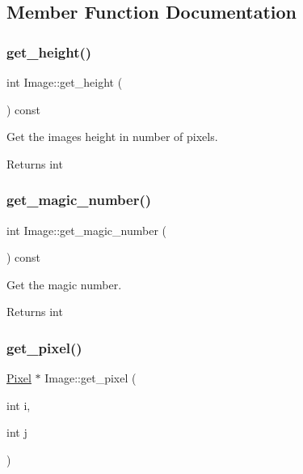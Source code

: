 \subsection{Member Function Documentation}
\mbox{\label{classImage_a04c7d24c9473e327e15c560c8193b684}} 
\subsubsection{\texorpdfstring{get\+\_\+height()}{get\_height()}}
{\footnotesize\ttfamily int Image\+::get\+\_\+height (\begin{DoxyParamCaption}{ }\end{DoxyParamCaption}) const}



Get the image\textquotesingle{}s height in number of pixels. 

\begin{DoxyReturn}{Returns}
int 
\end{DoxyReturn}
\mbox{\label{classImage_aa5d430b86cb564263b5fc09f0574daff}} 
\subsubsection{\texorpdfstring{get\+\_\+magic\+\_\+number()}{get\_magic\_number()}}
{\footnotesize\ttfamily int Image\+::get\+\_\+magic\+\_\+number (\begin{DoxyParamCaption}{ }\end{DoxyParamCaption}) const}



Get the magic number. 

\begin{DoxyReturn}{Returns}
int 
\end{DoxyReturn}
\mbox{\label{classImage_a7c7f88f027f4bfc564883fcf5a2e799b}} 
\subsubsection{\texorpdfstring{get\+\_\+pixel()}{get\_pixel()}}
{\footnotesize\ttfamily \hyperlink{classPixel}{Pixel} $\ast$ Image\+::get\+\_\+pixel (\begin{DoxyParamCaption}\item[{int}]{i,  }\item[{int}]{j }\end{DoxyParamCaption})}



